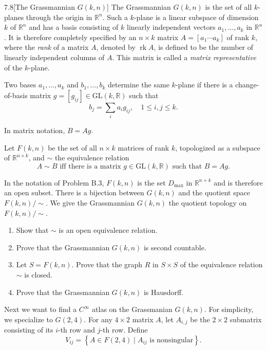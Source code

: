 \begin{problem}{7.8}[The Grassmannian \(G(k, n)\)]
The Grassmannian \( G(k, n) \) is the set of all \(k\)-planes through the origin in \( \mathbb{R}^{n} \). Such a \(k\)-plane is a linear subspace of dimension \(k\) of \( \mathbb{R}^{n} \) and has a basis consisting of \(k\) linearly independent vectors \( a_{1}, \ldots, a_{k} \) in \( \mathbb{R}^{n} \). It is therefore completely specified by an \( n\times k \) matrix \(A = [a_{1} \cdots a_{k}]\) of rank \(k\), where the \textit{rank} of a matrix \(A\), denoted by \(\operatorname{rk}A\), is defined to be the number of linearly independent columns of \(A\). This matrix is called a \textit{matrix representative} of the \(k\)-plane.

Two bases \( a_{1}, \ldots, a_{k} \) and \( b_{1}, \ldots, b_{k} \) determine the same \(k\)-plane if there is a change-of-basis matrix \(g = [g_{ij}] \in \mathrm{GL}(k, \mathbb{R})\) such that
\[
    b_{j} = \sum_{i} a_{i}g_{ij},\quad 1 \leq i, j\leq k.
\]

In matrix notation, \( B = Ag \).

Let \(F(k, n)\) be the set of all \(n\times k\) matrices of rank \(k\), topologized as a subspace of \( \mathbb{R}^{n\times k} \), and \(\sim\) the equivalence relation
\[
    A \sim B \text{  iff  } \text{there is a matrix } g \in \mathrm{GL}(k, \mathbb{R}) \text{ such that } B = Ag.
\]

In the notation of Problem B.3, \( F(k, n) \) is the set \( D_{\max} \) in \( \mathbb{R}^{n+k} \) and is therefore an open subset. There is a bijection between \( G(k, n) \) and the quotient space \( F(k,n)/\!\sim \). We give the Grassmannian \(G(k, n)\) the quotient topology on \( F(k,n)/\!\sim \).
\begin{enumerate}[label={(\alph*)},leftmargin=*]
    \item Show that \( \sim \) is an open equivalence relation.
    \item Prove that the Grassmannian \( G(k, n) \) is second countable.
    \item Let \( S = F(k,n) \). Prove that the graph \( R \) in \( S\times S \) of the equivalence relation \( \sim \) is closed.
    \item Prove that the Grassmannian \( G(k, n) \) is Hausdorff.
\end{enumerate}

Next we want to find a \( C^{\infty} \) atlas on the Grassmanian \( G(k, n) \). For simplicity, we specialize to \( G(2, 4) \). For any \( 4\times 2 \) matrix \(A\), let \( A_{i,j} \) be the \(2\times 2\) submatrix consisting of its \(i\)-th row and \(j\)-th row. Define
\[
    V_{ij} = \left\{ A \in F(2, 4) \mid A_{ij} \text{ is nonsingular} \right\}.
\]


\end{problem}
